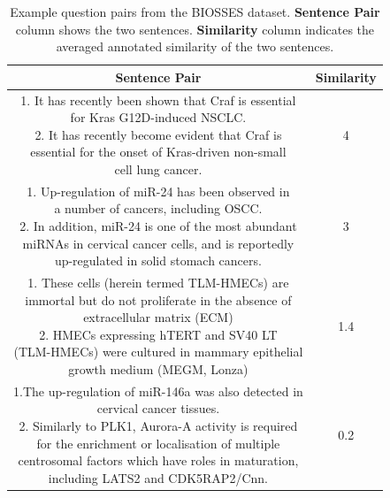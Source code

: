 \begin{enumerate}
	
	\begin{table}[ht!]
		\centering
			\begin{tabular}{c|c}
				\hline
				\multicolumn{1}{c|}{\textbf{Sentence Pair}} & 
				\multicolumn{1}{c}{\textbf{Similarity}}  \\
				\hline
				\makecell[l]{1. It has recently been shown that Craf is essential \\ for Kras G12D-induced NSCLC. \\ 
					2. It has recently become evident that Craf is \\ essential for the onset of Kras-driven non-small \\ cell lung cancer.} & 4  \\
				\hline
				\makecell[l]{1. Up-regulation of miR-24 has been observed in \\ a number of cancers, including OSCC. \\ 
					2. In addition, miR-24 is one of the most abundant \\ miRNAs in cervical cancer cells, and is reportedly \\ up-regulated in solid stomach cancers. } & 3 \\
				\hline
				\makecell[l]{1. These cells (herein termed TLM-HMECs) are \\ immortal but do not proliferate in the absence of \\ extracellular matrix (ECM) \\  
					2. HMECs expressing hTERT and SV40 LT \\ (TLM-HMECs) were cultured in mammary epithelial \\ growth medium (MEGM, Lonza)  } & 1.4  \\
				\hline
				\makecell[l]{1.The up-regulation of miR-146a was also detected in \\ cervical cancer tissues.  \\ 
					2. Similarly to PLK1, Aurora-A activity is required \\ for the enrichment or localisation of multiple \\ centrosomal  factors which have roles in maturation, \\ including LATS2 and CDK5RAP2/Cnn.} & 0.2  \\
				\hline               
			\end{tabular}
		\caption[Example question pairs from the BIOSSES dataset]{Example question  pairs from the BIOSSES dataset. \textbf{Sentence Pair} column shows the two sentences. \textbf{Similarity} column indicates the averaged annotated similarity of the two sentences.}
		\label{tab:biomeddata}
	\end{table} 


\end{enumerate}
